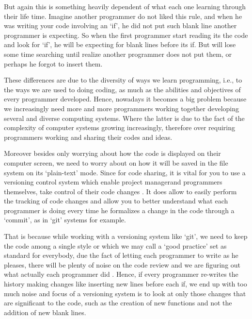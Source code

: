 \begin{englishtext}
    But again this is something heavily dependent of what each one learning
    through their life time. Imagine another programmer do not liked this rule,
    and when he was writing your code involving an `if', he did not put such
    blank line another programmer is expecting. So when the first programmer
    start reading its the code and look for `if', he will be expecting for blank
    lines before its if\s. But will lose some time searching until realize
    another programmer does not put them, or perhaps he forgot to insert them.
    \cite{quantifyingProgramComprehension}

    These differences are due to the diversity of ways we learn programming,
    i.e., to the ways we are used to doing coding, as much as the abilities and
    objectives of every programmer developed. Hence, nowadays it becomes a big
    problem because we increasingly need more and more programmers working
    together developing several and diverse computing systems. Where the latter
    is due to the fact of the complexity of computer systems growing
    increasingly, therefore over requiring programmers working and sharing their
    codes and ideas. \cite{howProgrammersRead}

    Moreover besides only worrying about how the code is displayed on their
    computer screen, we need to worry about on how it will be saved in the file
    system on its `plain-text' mode. Since for code sharing, it is vital for you
    to use a versioning control system which enable project manager\s and
    programmers themselves, take control of their code changes
    \cite{redesignOfGit}. It does allow to easily perform the tracking of code
    changes and allow you to better understand what each programmer is doing
    every time he formalizes a change in the code through a `commit', as in
    `git' systems for example. \cite{usingSourceControl}

    That is because while working with a versioning system like `git', we need
    to keep the code among a single style or which we may call a `good practice'
    set as standard for everybody, due the fact of letting each programmer to
    write as he pleases, there will be plenty of noise on the code review and we
    are figuring out what actually each programmer did \cite{quitDiffCalculating}.
    Hence, if every programmer re-writes the history making changes
    like inserting new lines
    before each if, we end up with too much noise and focus of a versioning
    system is to look at only those changes that are significant to the code,
    such as the creation of new functions and not the addition of new blank
    lines. \cite{findingRegressionsInProjects}


\end{englishtext}
